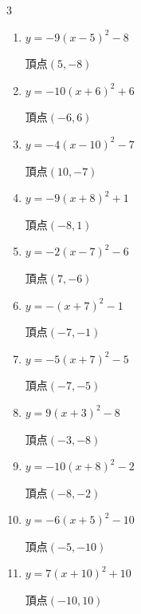 \begin{multicols}{3}
\begin{enumerate}
        $\displaystyle 頂点\left( -7 , 9 \right)$

  \item $\displaystyle y=-9\left( x-5\right)^{2}-8$

        $\displaystyle 頂点\left( 5 , -8 \right)$

  \item $\displaystyle y=-10\left( x+6\right)^{2}+6$

        $\displaystyle 頂点\left( -6 , 6 \right)$

  \item $\displaystyle y=-4\left( x-10\right)^{2}-7$

        $\displaystyle 頂点\left( 10 , -7 \right)$

  \item $\displaystyle y=-9\left( x+8\right)^{2}+1$

        $\displaystyle 頂点\left( -8 , 1 \right)$

  \item $\displaystyle y=-2\left( x-7\right)^{2}-6$

        $\displaystyle 頂点\left( 7 , -6 \right)$

  \item $\displaystyle y=-\left( x+7\right)^{2}-1$

        $\displaystyle 頂点\left( -7 , -1 \right)$

  \item $\displaystyle y=-5\left( x+7\right)^{2}-5$

        $\displaystyle 頂点\left( -7 , -5 \right)$

  \item $\displaystyle y=9\left( x+3\right)^{2}-8$

        $\displaystyle 頂点\left( -3 , -8 \right)$

  \item $\displaystyle y=-10\left( x+8\right)^{2}-2$

        $\displaystyle 頂点\left( -8 , -2 \right)$

\columnbreak %

  \item $\displaystyle y=-6\left( x+5\right)^{2}-10$

        $\displaystyle 頂点\left( -5 , -10 \right)$

  \item $\displaystyle y=7\left( x+10\right)^{2}+10$

        $\displaystyle 頂点\left( -10 , 10 \right)$


\end{enumerate}
\end{multicols}
